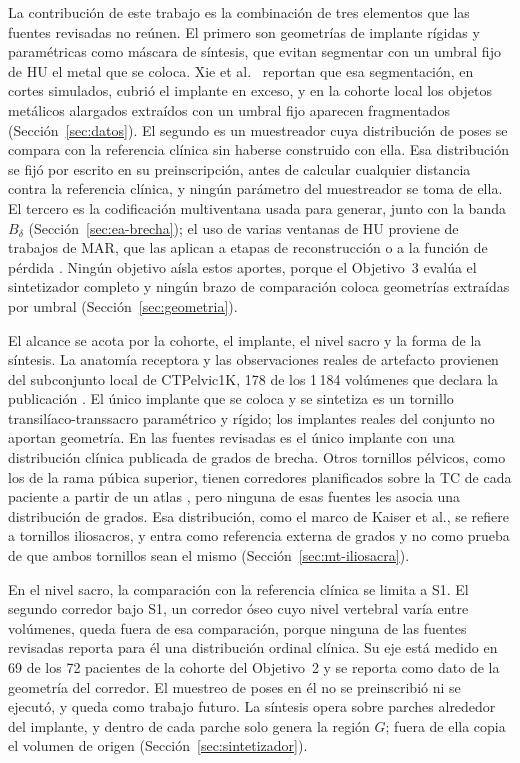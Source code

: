 La contribución de este trabajo es la combinación de tres elementos que las fuentes revisadas no reúnen. El primero son geometrías de implante rígidas y paramétricas como máscara de síntesis, que evitan segmentar con un umbral fijo de HU el metal que se coloca. Xie et al.~\cite{xie2024implantsegmentation} reportan que esa segmentación, en cortes simulados, cubrió el implante en exceso, y en la cohorte local los objetos metálicos alargados extraídos con un umbral fijo aparecen fragmentados (Sección~\ref{sec:datos}). El segundo es un muestreador cuya distribución de poses se compara con la referencia clínica sin haberse construido con ella. Esa distribución se fijó por escrito en su preinscripción, antes de calcular cualquier distancia contra la referencia clínica, y ningún parámetro del muestreador se toma de ella. El tercero es la codificación multiventana usada para generar, junto con la banda $B_{\delta}$ (Sección~\ref{sec:ea-brecha}); el uso de varias ventanas de HU proviene de trabajos de MAR, que las aplican a etapas de reconstrucción o a la función de pérdida \cite{wang2025adaptiveweighting,li2024}. Ningún objetivo aísla estos aportes, porque el Objetivo~3 evalúa el sintetizador completo y ningún brazo de comparación coloca geometrías extraídas por umbral (Sección~\ref{sec:geometria}).


El alcance se acota por la cohorte, el implante, el nivel sacro y la forma de la síntesis. La anatomía receptora y las observaciones reales de artefacto provienen del subconjunto local de CTPelvic1K, 178 de los 1\,184 volúmenes que declara la publicación \cite{liu2021ctpelvic1k}. El único implante que se coloca y se sintetiza es un tornillo transilíaco-transsacro paramétrico y rígido; los implantes reales del conjunto no aportan geometría. En las fuentes revisadas es el único implante con una distribución clínica publicada de grados de brecha. Otros tornillos pélvicos, como los de la rama púbica superior, tienen corredores planificados sobre la TC de cada paciente a partir de un atlas \cite{goerres2017planning,han2019atlasplanning}, pero ninguna de esas fuentes les asocia una distribución de grados. Esa distribución, como el marco de Kaiser et al., se refiere a tornillos iliosacros, y entra como referencia externa de grados y no como prueba de que ambos tornillos sean el mismo (Sección~\ref{sec:mt-iliosacra}).

En el nivel sacro, la comparación con la referencia clínica se limita a S1. El segundo corredor bajo S1, un corredor óseo cuyo nivel vertebral varía entre volúmenes, queda fuera de esa comparación, porque ninguna de las fuentes revisadas reporta para él una distribución ordinal clínica. Su eje está medido en 69 de los 72 pacientes de la cohorte del Objetivo~2 y se reporta como dato de la geometría del corredor. El muestreo de poses en él no se preinscribió ni se ejecutó, y queda como trabajo futuro. La síntesis opera sobre parches alrededor del implante, y dentro de cada parche solo genera la región $G$; fuera de ella copia el volumen de origen (Sección~\ref{sec:sintetizador}).


